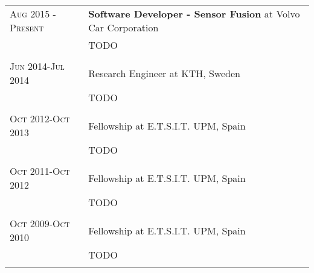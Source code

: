 \documentclass[a4paper,12pt]{article} %
\begin{document}
\begin{tabular}{R{4cm}|L{11cm}}
\textsc{Aug} 2015 - \textsc{Present}& \textbf{Software Developer - Sensor Fusion} at Volvo Car Corporation\\
& TODO\\
 \\


\textsc{Jun 2014-Jul 2014} & Research Engineer at \textsc{KTH}, Sweden \emph{}\\
& TODO\\
 \\


\textsc{Oct 2012-Oct 2013} & Fellowship at E.T.S.I.T. UPM, Spain\emph{}\\
& TODO\\
 \\


\textsc{Oct 2011-Oct 2012} & Fellowship at E.T.S.I.T. UPM, Spain\emph{}\\
& TODO\\
 \\


\textsc{Oct 2009-Oct 2010} & Fellowship at E.T.S.I.T. UPM, Spain\emph{}\\
& TODO\\
 \\
\end{tabular}

\end{document}
